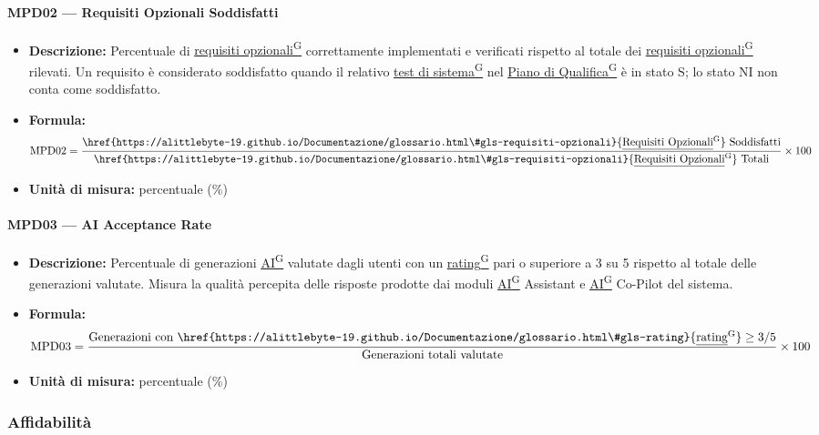 \documentclass[a4paper,12pt]{article}
\providecommand{\glslink}[2]{\href{https://alittlebyte-19.github.io/Documentazione/glossario.html\#gls-#1}{\underline{#2}\textsuperscript{\scriptsize G}}}
\begin{document}
\paragraph{MPD02 --- Requisiti Opzionali Soddisfatti}
\begin{itemize}
    \item \textbf{Descrizione:} Percentuale di \glslink{requisiti-opzionali}{requisiti opzionali} correttamente implementati e verificati rispetto al totale dei \glslink{requisiti-opzionali}{requisiti opzionali} rilevati. Un requisito è considerato soddisfatto quando il relativo \glslink{test-di-sistema}{test di sistema} nel \glslink{piano-di-qualifica}{Piano di Qualifica} è in stato S; lo stato NI non conta come soddisfatto.
    \item \textbf{Formula:}
    $$\text{MPD02} = \frac{\text{\glslink{requisiti-opzionali}{Requisiti Opzionali} Soddisfatti}}{\text{\glslink{requisiti-opzionali}{Requisiti Opzionali} Totali}} \times 100$$
    \item \textbf{Unità di misura:} percentuale (\%)
\end{itemize}

\paragraph{MPD03 --- AI Acceptance Rate}
\begin{itemize}
    \item \textbf{Descrizione:} Percentuale di generazioni \glslink{intelligenza-artificiale-ai}{AI} valutate dagli utenti con un \glslink{rating}{rating} pari o superiore a 3 su 5 rispetto al totale delle generazioni valutate. Misura la qualità percepita delle risposte prodotte dai moduli \glslink{intelligenza-artificiale-ai}{AI} Assistant e \glslink{intelligenza-artificiale-ai}{AI} Co-Pilot del sistema.
    \item \textbf{Formula:}
    $$\text{MPD03} = \frac{\text{Generazioni con \glslink{rating}{rating}} \geq 3/5}{\text{Generazioni totali valutate}} \times 100$$
    \item \textbf{Unità di misura:} percentuale (\%)
\end{itemize}

\subsubsection{Affidabilità}
\end{document}
